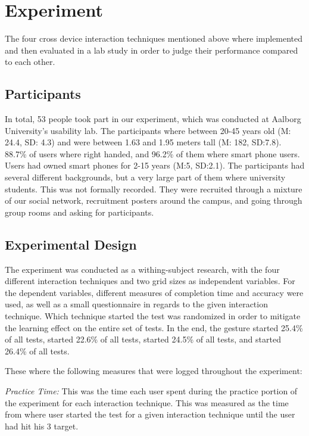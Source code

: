 \section{Experiment}
The four cross device interaction techniques mentioned above where implemented and then evaluated in a lab study in order to judge their performance compared to each other.

\subsection{Participants}
In total, 53 people took part in our experiment, which was conducted at Aalborg University's usability lab. The participants where between 20-45 years old (M: 24.4, SD: 4.3) and were between 1.63 and 1.95 meters tall (M: 182, SD:7.8). 88.7\% of users where right handed, and 96.2\% of them where smart phone users. Users had owned smart phones for 2-15 years (M:5, SD:2.1). The participants had several different backgrounds, but a very large part of them where university students. This was not formally recorded. They were recruited through a mixture of our social network, recruitment posters around the campus, and going through group rooms and asking for participants. 

\subsection{Experimental Design}
The experiment was conducted as a withing-subject research, with the four different interaction techniques and two grid sizes as independent variables. For the dependent variables, different measures of completion time and accuracy were used, as well as a small questionnaire in regards to the given interaction technique. Which technique started the test was randomized in order to mitigate the learning effect on the entire set of tests. In the end, the \pinch gesture started 25.4\% of all tests, \swipe started 22.6\% of all tests, \throw started 24.5\% of all tests, and \tilt started 26.4\% of all tests.

These where the following measures that were logged throughout the experiment: 

\textit{Practice Time:} This was the time each user spent during the practice portion of the experiment for each interaction technique. This was measured as the time from where user started the test for a given interaction technique until the user had hit his 3 target. 

